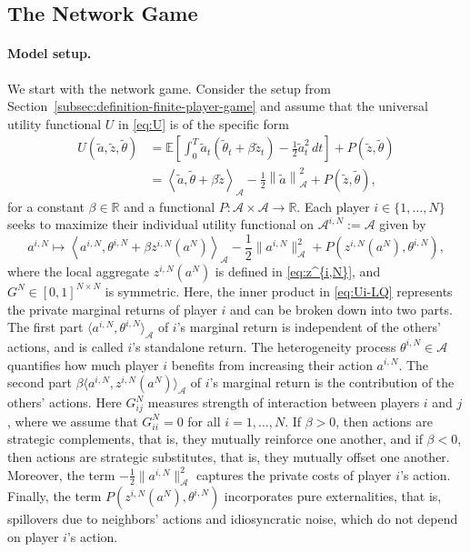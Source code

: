 \documentclass[11pt]{article}
\def\E{{\mathbb{E}}}
\newcommand{\R}{{\mathbb R}}
\newcommand{\be}{\begin{equation}}
\newcommand{\ee}{\end{equation}}
\numberwithin{equation}{section}
\begin{document}
\subsection{The Network Game}
\paragraph{Model setup.} We start with the network game. Consider the setup from Section~\ref{subsec:definition-finite-player-game} and assume that the universal utility functional $U$ in \eqref{eq:U} is of the specific form 
\be\label{eq:U-LQ}\begin{aligned}
U(\tilde a,\tilde z,\tilde\theta)&= \E\left[\int_0^T \tilde a_t\left(\tilde\theta_t+\beta\tilde z_t\right)-\frac{1}{2}\tilde a_t^2\,dt \right]+P(\tilde z,\tilde\theta)\\
&=\left\langle\tilde a,\tilde\theta+\beta\tilde z\right\rangle_{\mathcal{A}}-\frac{1}{2}\left\|\tilde a\right\|^2_{\mathcal{A}}+P(\tilde z,\tilde\theta),
\end{aligned}\ee
for a constant $\beta \in \mathbb{R}$ and a functional $P:\mathcal{A}\times\mathcal{A}\to\R$. 
Each player $i \in \{1, \ldots, N\}$ seeks to maximize their individual utility functional on $\mathcal{A}^{i,N}:=\mathcal{A}$ given by
\be \label{eq:Ui-LQ}
a^{i,N}\mapsto \left\langle a^{i,N},\theta^{i,N}+\beta z^{i,N}(a^N)\right\rangle_{\mathcal{A}}-\frac{1}{2}\| a^{i,N}\|^2_{\mathcal{A}}+P\left(z^{i,N}(a^N),\theta^{i,N}\right),
\ee 
where the local aggregate $z^{i,N}(a^N)$ is defined in \eqref{eq:z^{i,N}}, and $G^N\in [0,1]^{N\times N}$ is symmetric. Here, the inner product in \eqref{eq:Ui-LQ} represents the private marginal returns of player $i$ and can be broken down into two parts. The first part $\langle a^{i,N},\theta^{i,N}\rangle_{\mathcal{A}}$ of $i$'s marginal return is independent of the others' actions, and is called $i$'s standalone return. The heterogeneity process $\theta^{i,N}\in\mathcal{A}$ quantifies how much player $i$ benefits from increasing their action $a^{i,N}$. The second part $\beta \langle a^{i,N},z^{i,N}(a^N)\rangle_{\mathcal{A}}$ of $i$'s marginal return is the contribution of the others' actions. Here $G^N_{ij}$ measures strength of interaction between players $i$ and $j$, where we assume that $G^N_{ii}=0$ for all $i=1,\ldots, N$. If $\beta >0$, then actions are strategic complements, that is, they mutually reinforce one another, and if $\beta <0$, then actions are strategic substitutes, that is, they mutually offset one another. Moreover, the term $-\frac{1}{2}\|a^{i,N}\|^2_{\mathcal{A}}$ captures the private costs of player $i$'s action. Finally, the term $P(z^{i,N}(a^N),\theta^{i,N})$ incorporates pure externalities, that is, spillovers due to neighbors' actions and idiosyncratic noise, which do not depend on player $i$'s action.
\end{document}
